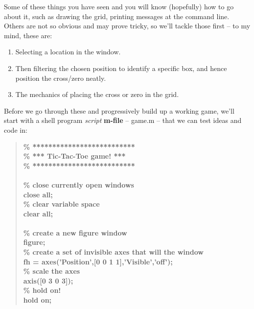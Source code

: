 \documentclass{tufte-book} %
\newenvironment{docspecbold}{\begin{quotation}\ttfamily\bfseries\parskip0pt\parindent0pt\ignorespaces}{\end{quotation}}
\begin{document}
Some of these things you have seen and you will know (hopefully) how to go about it, such as drawing the grid, printing messages at the command line. Others are not so obvious and may prove tricky, so we'll tackle those first -- to my mind, these are:
\begin{enumerate}[noitemsep]
\setlength{\itemindent}{.2in}
\item Selecting a location in the window.
\item Then filtering the chosen position to identify a specific box, and hence position the cross/zero neatly.
\item The mechanics of placing the cross or zero in the grid.
\end{enumerate}

Before we go through these and progressively build up a working game, we'll start with a shell program \textit{script} \textbf{m-file} -- \textsf{game.m} -- that we can test ideas and code in:
\begin{docspecbold}
\textcolor[rgb]{0,0.501961,0}{\% **************************\\
\% *** Tic-Tac-Toe game! ***\\
\% **************************\\}
\ \\
\textcolor[rgb]{0,0.501961,0}{\% close currently open windows\\}
close \textcolor[rgb]{1,0,1}{all};\\
\textcolor[rgb]{0,0.501961,0}{\% clear variable space\\}
clear all;\\
\ \\
\textcolor[rgb]{0,0.501961,0}{\% create a new figure window\\}
figure;\\
\textcolor[rgb]{0,0.501961,0}{\% create a set of invisible axes that will the window\\}
fh = axes(\textcolor[rgb]{1,0,1}{'Position'},[0 0 1 1],\textcolor[rgb]{1,0,1}{'Visible'},\textcolor[rgb]{1,0,1}{'off'});\\
\textcolor[rgb]{0,0.501961,0}{\% scale the axes\\}
axis([0 3 0 3]);\\
\textcolor[rgb]{0,0.501961,0}{\% hold on!\\}
hold \textcolor[rgb]{1,0,1}{on};
\end{docspecbold}
\end{document}
